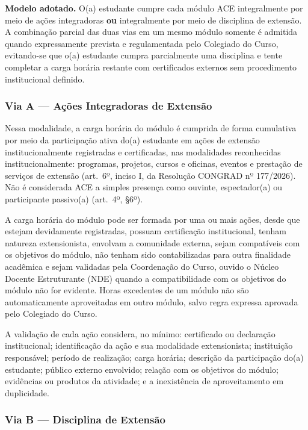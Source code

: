 \textbf{Modelo adotado.} O(a) estudante cumpre cada módulo ACE integralmente por meio de ações integradoras \textbf{ou} integralmente por meio de disciplina de extensão. A combinação parcial das duas vias em um mesmo módulo somente é admitida quando expressamente prevista e regulamentada pelo Colegiado do Curso, evitando-se que o(a) estudante cumpra parcialmente uma disciplina e tente completar a carga horária restante com certificados externos sem procedimento institucional definido.

\subsubsection{Via A --- Ações Integradoras de Extensão}

Nessa modalidade, a carga horária do módulo é cumprida de forma cumulativa por meio da participação ativa do(a) estudante em ações de extensão institucionalmente registradas e certificadas, nas modalidades reconhecidas institucionalmente: programas, projetos, cursos e oficinas, eventos e prestação de serviços de extensão (art.\ 6º, inciso I, da Resolução CONGRAD nº 177/2026). Não é considerada ACE a simples presença como ouvinte, espectador(a) ou participante passivo(a) (art.\ 4º, §6º).

A carga horária do módulo pode ser formada por uma ou mais ações, desde que estejam devidamente registradas, possuam certificação institucional, tenham natureza extensionista, envolvam a comunidade externa, sejam compatíveis com os objetivos do módulo, não tenham sido contabilizadas para outra finalidade acadêmica e sejam validadas pela Coordenação do Curso, ouvido o Núcleo Docente Estruturante (NDE) quando a compatibilidade com os objetivos do módulo não for evidente. Horas excedentes de um módulo não são automaticamente aproveitadas em outro módulo, salvo regra expressa aprovada pelo Colegiado do Curso.

A validação de cada ação considera, no mínimo: certificado ou declaração institucional; identificação da ação e sua modalidade extensionista; instituição responsável; período de realização; carga horária; descrição da participação do(a) estudante; público externo envolvido; relação com os objetivos do módulo; evidências ou produtos da atividade; e a inexistência de aproveitamento em duplicidade.

\subsubsection{Via B --- Disciplina de Extensão}


